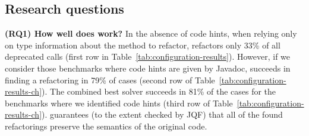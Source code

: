 \documentclass[sigconf,review,anonymous]{acmart}
\begin{document}



\subsection{Research questions}

{\bf (RQ1) How well does \tool work?}
In the absence of code hints, when relying only on type information about the method to refactor,
\tool refactors only 33\% of all deprecated calls (first row in Table~\ref{tab:configuration-results}).
However, if we consider those benchmarks where code hints are given by Javadoc,
\tool succeeds in finding a refactoring in 79\% of cases (second row of Table~\ref{tab:configuration-results-ch}). 
The combined best solver succeeds in 81\% of the cases for the benchmarks where we identified code hints (third row of Table~\ref{tab:configuration-results-ch}). 
\tool guarantees (to the extent checked by JQF) that all of the found refactorings preserve the semantics of the original code.
\end{document}
